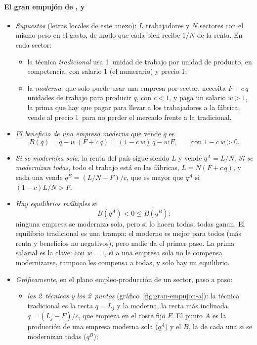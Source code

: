 \documentclass[11pt]{article}
\begin{document}
\paragraph{El gran empujón de ,  y }

\begin{itemize}
\item \emph{Supuestos} (letras locales de este anexo): $L$ trabajadores y $N$ sectores con el mismo peso en el gasto, de modo que cada bien recibe $1/N$ de la renta. En cada sector:
  \begin{itemize}
  \item la técnica \emph{tradicional} usa 1~unidad de trabajo por unidad de producto, en competencia, con salario 1 (el numerario) y precio 1;
  \item la \emph{moderna}, que solo puede usar una empresa por sector, necesita $F+c\,q$ unidades de trabajo para producir $q$, con $c<1$, y paga un salario $w>1$, la prima que hay que pagar para llevar a los trabajadores a la fábrica; vende al precio 1~para no perder el mercado frente a la tradicional.
  \end{itemize}
\item \emph{El beneficio de una empresa moderna} que vende $q$ es
  \[
  B(q)=q-w\,(F+c\,q)=(1-c\,w)\,q-w\,F ,\qquad\text{con } 1-c\,w>0 .
  \]
\item \emph{Si se moderniza sola}, la renta del país sigue siendo $L$ y vende $q^A=L/N$. \emph{Si se modernizan todas}, todo el trabajo está en las fábricas, $L=N(F+c\,q)$, y cada una vende $q^B=(L/N-F)/c$, que es mayor que $q^A$ si $(1-c)L/N>F$.
\item \emph{Hay equilibrios múltiples} si
  \[
  B(q^A)<0\leq B(q^B):
  \]
  ninguna empresa se moderniza sola, pero si lo hacen todas, todas ganan. El equilibrio tradicional es una trampa: el moderno es mejor para todos (más renta y beneficios no negativos), pero nadie da el primer paso. La prima salarial es la clave: con $w=1$, si a una empresa sola no le compensa modernizarse, tampoco les compensa a todas, y solo hay un equilibrio.
\item \emph{Gráficamente}, en el plano empleo-producción de un sector, paso a paso:
  \begin{itemize}
  \item \emph{las 2~técnicas y los 2~puntos} (gráfico~\ref{fig:gran-empujon-a}): la técnica tradicional es la recta $q=L_j$ y la moderna, la recta más inclinada $q=(L_j-F)/c$, que empieza en el coste fijo $F$. El punto $A$ es la producción de una empresa moderna sola ($q^A$) y el $B$, la de cada una si se modernizan todas ($q^B$);

\end{itemize}
\end{itemize}
\end{document}
